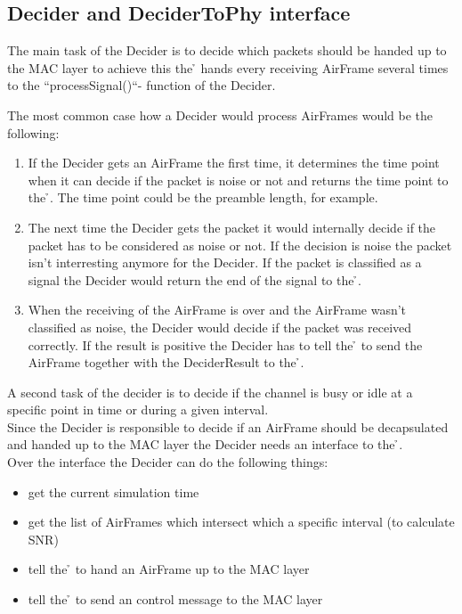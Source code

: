 \subsection{Decider and DeciderToPhy interface}
\label{decider}

The main task of the Decider is to decide which packets should be handed up to
the MAC layer to achieve this the \h{\bp} hands every receiving AirFrame
several times to the ``processSignal()``- function of the Decider.

\label{ProcessSignal}
The most common case how a Decider would process AirFrames would be the
following:

\begin{enumerate}
 \item If the Decider gets an AirFrame the first time, it determines the time
point when it can decide if the packet is noise or not and returns the time
point to the \h{\bp}. The time point could be the preamble length, for example.

 \item The next time the Decider gets the packet it would internally decide if
the packet has to be considered as noise or not. If the decision is noise the
packet isn't interresting anymore for the Decider. If the packet is classified
as a signal the Decider would return the end of the signal to the \h{\bp}.

 \item When the receiving of the AirFrame is over and the AirFrame wasn't
classified as noise, the Decider would decide if the packet was received
correctly. If the result is positive the Decider has to tell the \h{\bp} to
send the AirFrame together with the DeciderResult to the \h{\bm}.
\end{enumerate}

A second task of the decider is to decide if the channel is busy or idle at a
specific point in time or during a given interval.\\

Since the Decider is responsible to decide if an AirFrame should be
decapsulated and handed up to the MAC layer the Decider needs an interface to
the \h{\bp}.\\

Over the interface the Decider can do the following things:

\begin{itemize}
 \item get the current simulation time
 \item get the list of AirFrames which intersect which a specific interval (to
calculate SNR)
 \item tell the \h{\bp} to hand an AirFrame up to the MAC layer
 \item tell the \h{\bp} to send an control message to the MAC layer
\end{itemize}

